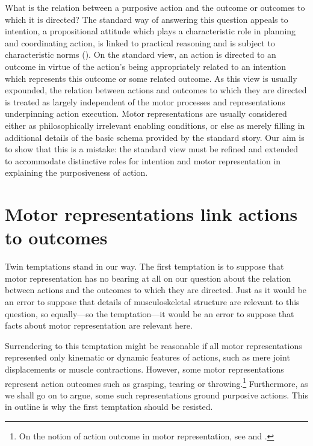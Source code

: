 \documentclass[12pt,\papersize]{extarticle}
\begin{document}
What is the relation between a purposive action and the outcome or outcomes to which it is directed? The standard way of answering this question appeals to intention, a propositional attitude which plays a characteristic role in planning and coordinating action, is linked to practical reasoning and is subject to characteristic norms (\citealp{Bratman:1987xw}).  On the standard view, an action is directed to an outcome in virtue of the action's being appropriately related to an intention which represents this outcome or some related outcome. As this view is usually expounded, the relation between actions and outcomes to which they are directed is treated as largely independent of the motor processes and representations underpinning action execution. Motor representations are usually considered either as philosophically irrelevant enabling conditions, or else as merely filling in additional details of the basic schema provided by the standard story. Our aim is to show that this is a mistake:
the standard view must be  refined and extended  to accommodate distinctive roles for intention and motor representation in explaining the purposiveness of action.




\section{Motor representations link actions to outcomes}

Twin temptations stand in our way.
The first  temptation is to suppose that motor representation has no bearing at all on our question about the relation between actions and the outcomes to which they are directed. Just as it would be an error to suppose that details of musculoskeletal structure are relevant to this question, so equally---so the temptation---it would be an error to suppose that facts about motor representation are relevant here. 

Surrendering to this temptation might be reasonable if all motor representations represented only kinematic or dynamic features of actions, such as mere joint displacements or muscle contractions. However, 
 some motor representations represent action outcomes such as grasping, tearing or throwing.\footnote{ On the notion of action outcome in motor representation, see \citet{jeannerod_motor_2006} and \citet{rizzolatti_mirrors_2008}.}
 Furthermore, as we shall go on to argue, some such representations ground purposive actions. This in outline is why the first temptation should be resisted.
\end{document}
